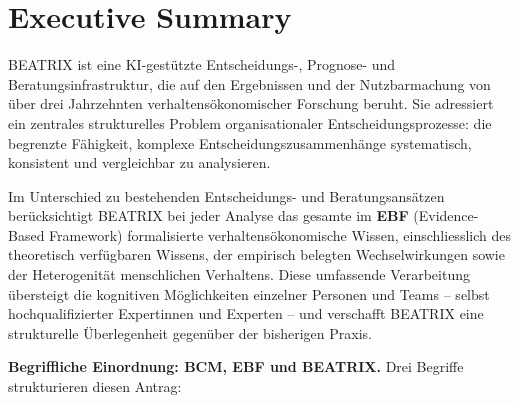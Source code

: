 \documentclass[11pt,a4paper]{article}
\begin{document}

\tableofcontents
\newpage


\section{Executive Summary}

BEATRIX ist eine KI-gestützte Entscheidungs-, Prognose- und Beratungsinfrastruktur, die auf den Ergebnissen und der Nutzbarmachung von über drei Jahrzehnten verhaltensökonomischer Forschung beruht. Sie adressiert ein zentrales strukturelles Problem organisationaler Entscheidungsprozesse: die begrenzte Fähigkeit, komplexe Entscheidungszusammenhänge systematisch, konsistent und vergleichbar zu analysieren.

Im Unterschied zu bestehenden Entscheidungs- und Beratungsansätzen berücksichtigt BEATRIX bei jeder Analyse das gesamte im \textbf{EBF} (Evidence-Based Framework) formalisierte verhaltensökonomische Wissen, einschliesslich des theoretisch verfügbaren Wissens, der empirisch belegten Wechselwirkungen sowie der Heterogenität menschlichen Verhaltens. Diese umfassende Verarbeitung übersteigt die kognitiven Möglichkeiten einzelner Personen und Teams -- selbst hochqualifizierter Expertinnen und Experten -- und verschafft BEATRIX eine strukturelle Überlegenheit gegenüber der bisherigen Praxis.

\vspace{0.5cm}
\noindent\textbf{Begriffliche Einordnung: BCM, EBF und BEATRIX.} Drei Begriffe strukturieren diesen Antrag:
\end{document}
